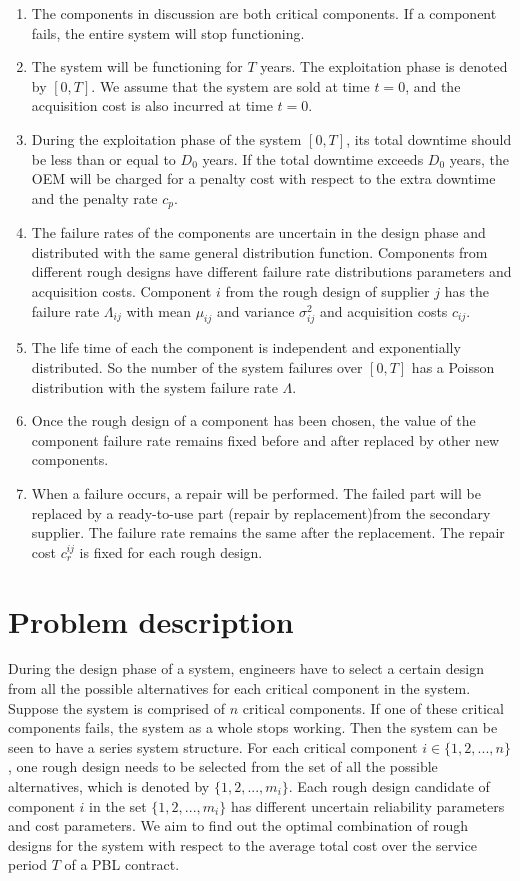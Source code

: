 \documentclass[preprint,12pt]{elsarticle}
\begin{document}
   \begin{enumerate}
   \item The components in discussion are both critical components. If a component fails, the entire system will stop functioning.
  \item The system will be functioning for $T$ years. The exploitation phase is denoted by $[0, T]$. We assume that the system are sold at time $t=0$, and the acquisition cost is also incurred at time $t=0$.
	 \item During the exploitation phase of the system $[0, T]$, its total downtime should be less than or equal to $D_0$ years. If the total downtime exceeds $D_0$ years, the OEM will be charged for a penalty cost with respect to the extra downtime and the penalty rate $c_p$.
	 \item The failure rates of the components are uncertain in the design phase and distributed with the same general distribution function. Components from different rough designs have different failure rate distributions parameters and acquisition costs. Component $i$ from the rough design of supplier $j$ has the failure rate $\Lambda_{ij}$ with mean $\mu_{ij}$ and variance $\sigma_{ij}^2$ and acquisition costs $c_{ij}$.
	 \item The life time of each the component is independent and exponentially distributed. So the number of the system failures over $[0, T]$ has a Poisson distribution with the system failure rate $\Lambda$.
		\item	Once the rough design of a component has been chosen, the value of the component failure rate remains fixed before and after replaced by other new components.
  \item When a failure occurs, a repair will be performed. The failed part will be replaced by a ready-to-use part (repair by replacement)from the secondary supplier. The failure rate remains the same after the replacement. The repair cost $c_r^{ij}$ is fixed for each rough design.
 	
	\end{enumerate}
\section{Problem description}
During the design phase of a system, engineers have to select a certain design from all the possible alternatives for each critical component in the system. Suppose the system is comprised of $n$ critical components. If one of these critical components fails, the system as a whole stops working. Then the system can be seen to have a series system structure. For each critical component $i \in \{1,2,...,n\}$, one rough design needs to be selected from the set of all the possible alternatives, which is denoted by $\{1,2,...,m_i\}$. Each rough design candidate of component $i$ in the set $\{1,2,...,m_i\}$ has different uncertain reliability parameters and cost parameters. We aim to find out the optimal combination of rough designs for the system with respect to the average total cost over the service period $T$ of a PBL contract.
\end{document}
